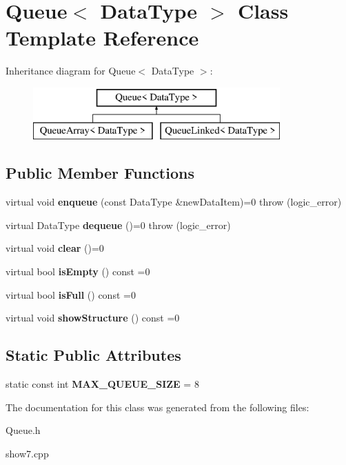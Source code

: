 \section{Queue$<$ Data\+Type $>$ Class Template Reference}
\label{class_queue}
Inheritance diagram for Queue$<$ Data\+Type $>$\+:\begin{figure}[H]
\begin{center}
\leavevmode
\includegraphics[height=2.000000cm]{class_queue}
\end{center}
\end{figure}
\subsection*{Public Member Functions}
\begin{DoxyCompactItemize}
\item 
virtual void {\bfseries enqueue} (const Data\+Type \&new\+Data\+Item)=0  throw (logic\+\_\+error)\label{class_queue_a4e0052bab8c2fb742a16a77d73ec3d5a}

\item 
virtual Data\+Type {\bfseries dequeue} ()=0  throw (logic\+\_\+error)\label{class_queue_afde1535196f515caba0aa5cfbe62d329}

\item 
virtual void {\bfseries clear} ()=0\label{class_queue_afba4d82c9a20859bb6397bd73c230cdd}

\item 
virtual bool {\bfseries is\+Empty} () const =0\label{class_queue_a1b8e1c0b8bb621de8d4f20c011176bd2}

\item 
virtual bool {\bfseries is\+Full} () const =0\label{class_queue_ae64751e270709a705d49e6168e64ade8}

\item 
virtual void {\bfseries show\+Structure} () const =0\label{class_queue_a44c7efe23657b7e1ed2ab1f815120eba}

\end{DoxyCompactItemize}
\subsection*{Static Public Attributes}
\begin{DoxyCompactItemize}
\item 
static const int {\bfseries M\+A\+X\+\_\+\+Q\+U\+E\+U\+E\+\_\+\+S\+I\+Z\+E} = 8\label{class_queue_aaf3eed0540baaf6609b48910aacc7133}

\end{DoxyCompactItemize}


The documentation for this class was generated from the following files\+:\begin{DoxyCompactItemize}
\item 
Queue.\+h\item 
show7.\+cpp\end{DoxyCompactItemize}
